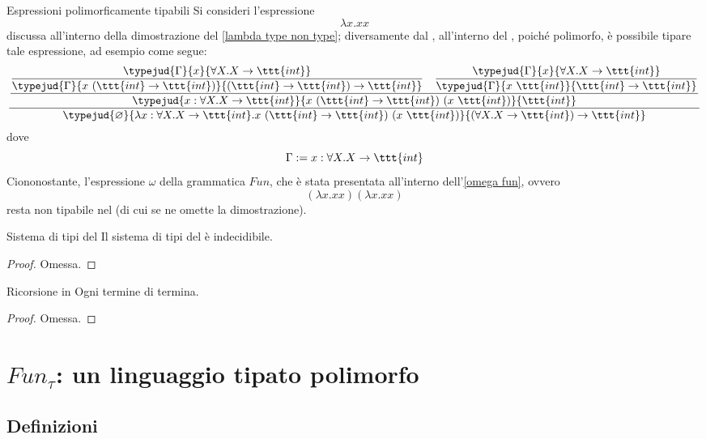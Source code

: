 \documentclass[a4paper, 12pt]{report}
\begin{document}
    \begin{framedobs}[label={exp poly typable}]{Espressioni polimorficamente tipabili}
        Si consideri l'espressione $$\lambda x.xx$$ discussa all'interno della dimostrazione del \cref{lambda type non type}; diversamente dal , all'interno del , poiché polimorfo, è possibile tipare tale espressione, ad esempio come segue: $$\dfrac{\dfrac{\dfrac{\typejud{\Gamma}{x}{\forall X.X \to \ttt{int}}}{\typejud{\Gamma}{x \ (\ttt{int} \to \ttt{int})}{(\ttt{int} \to \ttt{int}) \to \ttt{int}}} \quad \dfrac{\typejud{\Gamma}{x}{\forall X. X \to \ttt{int}}}{\typejud{\Gamma}{x \ \ttt{int}}{\ttt{int} \to \ttt{int}}}}{\typejud{x:\forall X.X \to \ttt{int}}{x \ (\ttt{int} \to \ttt{int}) \ (x \ \ttt{int})}{\ttt{int}}}}{\typejud{\varnothing}{\lambda x:\forall X.X \to \ttt{int}.x \ (\ttt{int} \to \ttt{int}) \ (x \ \ttt{int})}{(\forall X .X \to \ttt{int}) \to \ttt{int}}}$$ dove $$\Gamma := x : \forall X.X \to \ttt{int}$$ Ciononostante, l'espressione $\omega$ della grammatica $Fun$, che è stata presentata all'interno dell'\cref{omega fun}, ovvero $$(\lambda x. xx) (\lambda x. xx)$$ resta non tipabile nel  (di cui se ne omette la dimostrazione).
    \end{framedobs}

    \begin{framedthm}{Sistema di tipi del }
        Il sistema di tipi del  è indecidibile.
    \end{framedthm}

    \begin{proof}
        Omessa.
    \end{proof}

    \begin{framedprop}{Ricorsione in }
        Ogni termine di  termina.
    \end{framedprop}

    \begin{proof}
        Omessa.
    \end{proof}

    \section{$Fun_\tau$: un linguaggio tipato polimorfo}

    \subsection{Definizioni}
\end{document}
